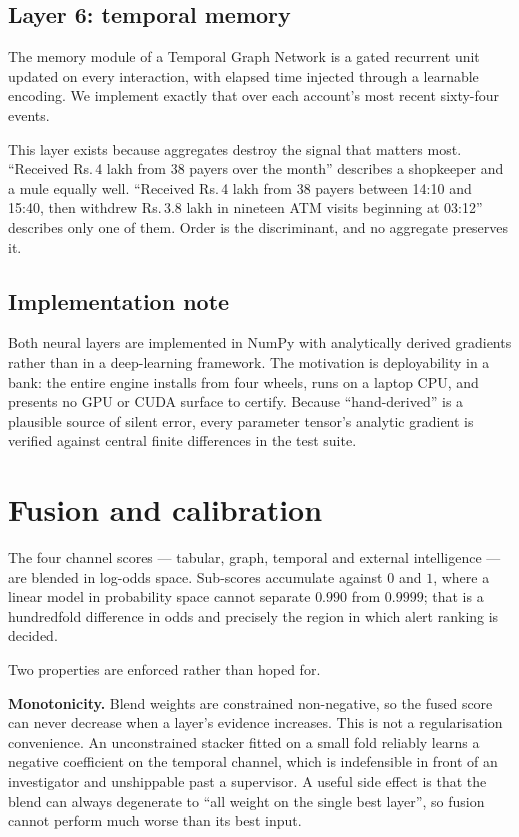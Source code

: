 \documentclass{article}
\providecommand{\rupee}{\textsf{Rs.}\,}
\begin{document}
\subsection{Layer 6: temporal memory}

The memory module of a Temporal Graph Network \cite{rossi2020} is a gated
recurrent unit updated on every interaction, with elapsed time injected through
a learnable encoding. We implement exactly that over each account's most recent
sixty-four events.

This layer exists because aggregates destroy the signal that matters most.
``Received \rupee4 lakh from 38 payers over the month'' describes a shopkeeper
and a mule equally well. ``Received \rupee4 lakh from 38 payers between 14:10 and
15:40, then withdrew \rupee3.8 lakh in nineteen ATM visits beginning at 03:12''
describes only one of them. Order is the discriminant, and no aggregate
preserves it.

\subsection{Implementation note}

Both neural layers are implemented in NumPy with analytically derived gradients
rather than in a deep-learning framework. The motivation is deployability in a
bank: the entire engine installs from four wheels, runs on a laptop CPU, and
presents no GPU or CUDA surface to certify. Because ``hand-derived'' is a
plausible source of silent error, every parameter tensor's analytic gradient is
verified against central finite differences in the test suite.

\section{Fusion and calibration}
\label{sec:fusion}

The four channel scores --- tabular, graph, temporal and external intelligence
--- are blended in log-odds space. Sub-scores accumulate against $0$ and $1$,
where a linear model in probability space cannot separate $0.990$ from $0.9999$;
that is a hundredfold difference in odds and precisely the region in which alert
ranking is decided.

Two properties are enforced rather than hoped for.

\noindent\textbf{Monotonicity.} Blend weights are constrained non-negative, so
the fused score can never decrease when a layer's evidence increases. This is
not a regularisation convenience. An unconstrained stacker fitted on a small
fold reliably learns a negative coefficient on the temporal channel, which is
indefensible in front of an investigator and unshippable past a supervisor. A
useful side effect is that the blend can always degenerate to ``all weight on
the single best layer'', so fusion cannot perform much worse than its best
input.
\end{document}
